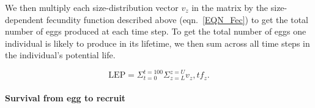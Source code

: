\documentclass[12pt, oneside]{article}   	%
\begin{document}



We then multiply each size-distribution vector $v_z$ in the matrix by the size-dependent fecundity function described above (eqn.\ \ref{EQN_Fec}) to get the total number of eggs produced at each time step. To get the total number of eggs one individual is likely to produce in its lifetime, we then sum across all time steps in the individual's potential life.  

\begin{equation} %
\text{LEP} = \Sigma_{t=0}^{t=100} \Sigma_{z=L}^{z=U} v_z,t f_z. \label{EQN_LEP}
\end{equation}

\paragraph*{Survival from egg to recruit}
\end{document}
